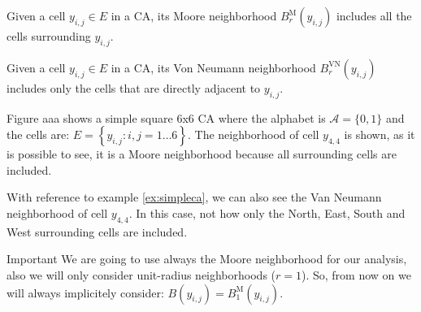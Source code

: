 \begin{definition}
\label{def:neighmoore}
Given a cell $y_{i,j} \in E$ in a CA, its Moore neighborhood $B^\text{M}_r\left( y_{i,j} \right)$
includes all the cells surrounding
$y_{i,j}$.
\end{definition}

\begin{definition}
\label{def:neighmoore}
Given a cell $y_{i,j} \in E$ in a CA, its Von Neumann neighborhood $B^\text{VN}_r\left( y_{i,j} \right)$
includes only the cells that are
directly adjacent to $y_{i,j}$.
\end{definition}

\begin{example}
\label{ex:simpleca}
Figure aaa shows a simple square 6x6 CA where the alphabet is $\mathcal{A}=\{ 0, 1 \}$ and the
cells are: $E = \left\{ y_{i,j} : i,j = 1 \dots 6 \right\}$. The neighborhood of cell $y_{4,4}$
is shown, as it is possible to see, it is a Moore neighborhood because all surrounding cells are
included.
\end{example}

\begin{example}
\label{ex:vnneigh}
With reference to example \ref{ex:simpleca}, we can also see the Van Neumann neighborhood of
cell $y_{4,4}$. In this case, not how only the North, East, South and West surrounding cells
are included.
\end{example}

\begin{important}{Important}
We are going to use always the Moore neighborhood for our analysis, also we will only consider
unit-radius neighborhoods ($r=1$). So, from now on we will always implicitely consider:
$B\left( y_{i,j} \right) = B^\text{M}_1\left( y_{i,j} \right)$.
\end{important}


